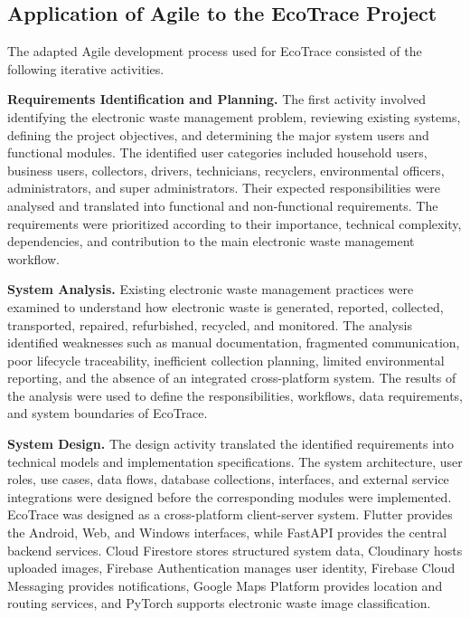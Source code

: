 \subsection{Application of Agile to the EcoTrace Project}

The adapted Agile development process used for EcoTrace consisted of the
following iterative activities.

\textbf{Requirements Identification and Planning.} The first activity involved
identifying the electronic waste management problem, reviewing existing
systems, defining the project objectives, and determining the major system users
and functional modules. The identified user categories included household users,
business users, collectors, drivers, technicians, recyclers, environmental officers,
administrators, and super administrators. Their expected responsibilities were
analysed and translated into functional and non-functional requirements. The
requirements were prioritized according to their importance, technical
complexity, dependencies, and contribution to the main electronic waste
management workflow.

\textbf{System Analysis.} Existing electronic waste management practices were
examined to understand how electronic waste is generated, reported, collected,
transported, repaired, refurbished, recycled, and monitored. The analysis
identified weaknesses such as manual documentation, fragmented
communication, poor lifecycle traceability, inefficient collection planning, limited
environmental reporting, and the absence of an integrated cross-platform system.
The results of the analysis were used to define the responsibilities, workflows,
data requirements, and system boundaries of EcoTrace.

\textbf{System Design.} The design activity translated the identified
requirements into technical models and implementation specifications. The
system architecture, user roles, use cases, data flows, database collections,
interfaces, and external service integrations were designed before the
corresponding modules were implemented. EcoTrace was designed as a
cross-platform client-server system. Flutter provides the Android, Web, and
Windows interfaces, while FastAPI provides the central backend services. Cloud
Firestore stores structured system data, Cloudinary hosts uploaded images,
Firebase Authentication manages user identity, Firebase Cloud Messaging
provides notifications, Google Maps Platform provides location and routing
services, and PyTorch supports electronic waste image classification.


